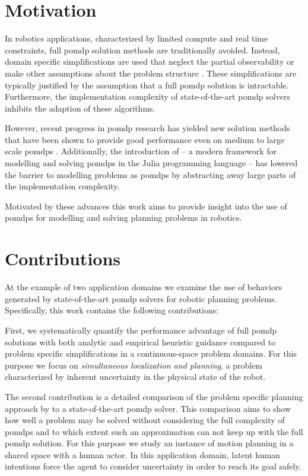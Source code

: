 \section{Motivation}\label{sec:motivation}

In robotics applications, characterized by limited compute and real time
constraints, full \ac{pomdp} solution methods are traditionally avoided.
Instead, domain specific simplifications are used that neglect the partial
observability or make other assumptions about the problem structure
\cite{sadigh2016information, fisac2018probabilistically}. These simplifications
are typically justified by the assumption that a full \ac{pomdp} solution is
intractable. Furthermore, the implementation complexity of state-of-the-art
\ac{pomdp} solvers inhibits the adaption of these algorithms.

However, recent progress in \ac{pomdp} research has yielded new solution methods that
have been shown to provide good performance even on medium to large scale
\acp{pomdp} \cite{somani2013despot,sunberg2018online}. Additionally, the
introduction of \pomdpsjl \cite{egorov2017pomdps} -- a modern framework for
modelling and solving \acp{pomdp} in the Julia programming language -- has
lowered the barrier to modelling problems as \acp{pomdp} by abstracting away
large parts of the implementation complexity.

Motivated by these advances this work aims to provide insight into the use of
\acp{pomdp} for modelling and solving planning problems in robotics.

\section{Contributions}%
\label{sec:contributions}

At the example of two application domains we examine the use of behaviors
generated by state-of-the-art \ac{pomdp} solvers for robotic planning problems.
Specifically, this work contains the following contributions:

First, we systematically quantify the performance advantage of full
\ac{pomdp} solutions with both analytic and empirical heuristic guidance
compared to problem specific simplifications in a continuous-space problem
domains. For this purpose we focus on \emph{simultaneous localization and
planning}, a problem characterized by inherent uncertainty in the physical
state of the robot.

The second contribution is a detailed comparison of the problem specific
planning approach by \cite{fisac2018probabilistically} to a state-of-the-art
\ac{pomdp} solver. This comparison aims to show how well a problem may be
solved without considering the full complexity of \acp{pomdp} and to which
extent such an approximation can not keep up with the full \ac{pomdp} solution.
For this purpose we study an instance of motion planning in a shared space with
a human actor. In this application domain, latent human intentions force the
agent to consider uncertainty in order to reach its goal safely.

